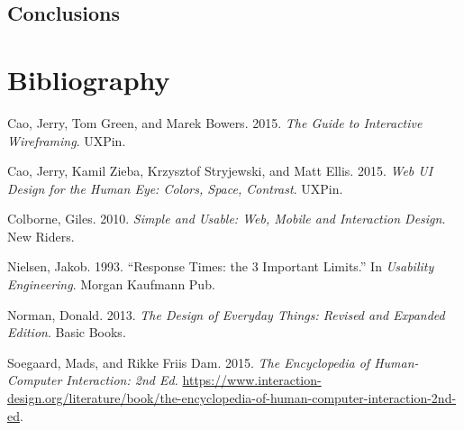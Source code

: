 \documentclass[12pt,svgnames]{memoir}
\begin{document}
\section{Conclusions}\label{conclusions}

\chapter*{Bibliography}\label{bibliography}


Cao, Jerry, Tom Green, and Marek Bowers. 2015. \emph{The Guide to
Interactive Wireframing}. UXPin.

Cao, Jerry, Kamil Zieba, Krzysztof Stryjewski, and Matt Ellis. 2015.
\emph{Web UI Design for the Human Eye: Colors, Space, Contrast}. UXPin.

Colborne, Giles. 2010. \emph{Simple and Usable: Web, Mobile and
Interaction Design}. New Riders.

Nielsen, Jakob. 1993. ``Response Times: the 3 Important Limits.'' In
\emph{Usability Engineering}. Morgan Kaufmann Pub.

Norman, Donald. 2013. \emph{The Design of Everyday Things: Revised and
Expanded Edition}. Basic Books.

Soegaard, Mads, and Rikke Friis Dam. 2015. \emph{The Encyclopedia of
Human-Computer Interaction: 2nd Ed.}
\url{https://www.interaction-design.org/literature/book/the-encyclopedia-of-human-computer-interaction-2nd-ed}.
\end{document}

